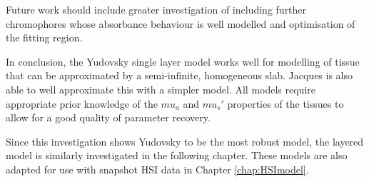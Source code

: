 Future work should include 
greater investigation of including further chromophores whose absorbance behaviour is well modelled and optimisation of the fitting region. 

In conclusion, the Yudovsky single layer model works well for modelling of tissue that can be approximated by a semi-infinite, homogeneous slab. Jacques is also able to well approximate this with a simpler model. All models require appropriate prior knowledge of the $mu_a$ and $mu_s'$ properties of the tissues to allow for a good quality of parameter recovery. 

Since this investigation shows Yudovsky to be the most robust model, the layered model is similarly investigated in the following chapter. These models are also adapted for use with snapshot HSI data in Chapter \ref{chap:HSImodel}. 








